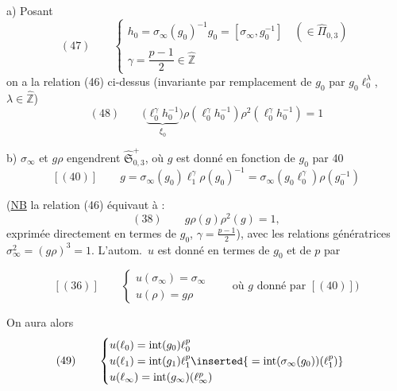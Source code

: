  a) Posant
\[
(47)\qquad
\begin{cases}
h_0=\sigma_\infty(g_0)^{-1}g_0=[\sigma_\infty,g_0^{-1}]
   \quad(\in\widehat{\Pi}_{0,3})\\
\gamma=\dfrac{p-1}{2}\in\widehat{\mathbb Z}
\end{cases}
\]
on a la relation (46) ci-dessus (invariante par remplacement de $g_0$ par
$g_0\ell_0^\lambda$, $\lambda\in\widehat{\mathbb Z}$)
\[
(48)\qquad
\bigl(\underbrace{\ell_0^\gamma h_0^{-1}}_{\xi_0}\bigr)
\rho(\ell_0^\gamma h_0^{-1})\rho^2(\ell_0^\gamma h_0^{-1})=1
\]

 b) $\sigma_\infty$ et $g\rho$ engendrent 
$\widehat{\mathfrak S}_{0,3}^{+}$,
où $g$ est donné en fonction de $g_0$ par 40
\[
[(40)]\qquad
g=\sigma_\infty(g_0)\ell_1^\gamma\rho(g_0)^{-1}
=\sigma_\infty(g_0\ell_0^\gamma)\rho(g_0^{-1})
\]

(\uline{NB} la relation (46) équivaut à :
\[
(38)\qquad g\rho(g)\rho^2(g)=1,
\]
exprimée directement en termes de $g_0$, $\gamma=\frac{p-1}{2}$),
avec les relations génératrices $\sigma_\infty^2=(g\rho)^3=1$.
L'autom.\ $u$ est donné en termes de $g_0$ et de $p$ par


\[
[(36)]\qquad
\begin{cases}
u(\sigma_\infty)=\sigma_\infty\\
u(\rho)=g\rho
\end{cases}
\qquad\text{où }g\text{ donné par }[(40)])
\]

On aura alors
\[
(49)\qquad
\begin{cases}
u(\ell_0)=\operatorname{int}(g_0)\ell_0^p\\
u(\ell_1)=\operatorname{int}(g_1)\ell_1^p
 \inserted{{}=\operatorname{int}(\sigma_\infty(g_0))(\ell_1^p)}\\
u(\ell_\infty)=\operatorname{int}(g_\infty)(\ell_\infty^p)
\end{cases}
\]

